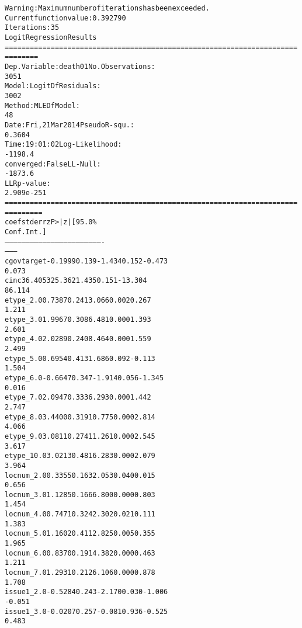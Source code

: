 \documentclass[letterpaper,10pt,english]{/usr/share/sphinx/texinputs/sphinxhowto}
\newenvironment{InvisibleVerbatim}
        {\begin{mdframed}[leftmargin=0.1\linewidth,innerleftmargin=3pt,innerrightmargin=3pt, userdefinedwidth=1\linewidth, linewidth=0pt, linecolor=white, usetwoside=false]}
        {\end{mdframed}}
\begin{document}
                \begin{InvisibleVerbatim}
                \vspace{-0.5\baselineskip}
\begin{alltt}Warning: Maximum number of iterations has been exceeded.
         Current function value: 0.392790
         Iterations: 35
                           Logit Regression Results
======================================================================
========
Dep. Variable:                death01   No. Observations:
3051
Model:                          Logit   Df Residuals:
3002
Method:                           MLE   Df Model:
48
Date:                Fri, 21 Mar 2014   Pseudo R-squ.:
0.3604
Time:                        19:01:02   Log-Likelihood:
-1198.4
converged:                      False   LL-Null:
-1873.6
                                        LLR p-value:
2.909e-251
======================================================================
=========
                  coef    std err          z      P>|z|      [95.0\%
Conf. Int.]
----------------------------------------------------------------------
---------
cgovtarget     -0.1999      0.139     -1.434      0.152        -0.473
0.073
cinc           36.4053     25.362      1.435      0.151       -13.304
86.114
etype\_2.0       0.7387      0.241      3.066      0.002         0.267
1.211
etype\_3.0       1.9967      0.308      6.481      0.000         1.393
2.601
etype\_4.0       2.0289      0.240      8.464      0.000         1.559
2.499
etype\_5.0       0.6954      0.413      1.686      0.092        -0.113
1.504
etype\_6.0      -0.6647      0.347     -1.914      0.056        -1.345
0.016
etype\_7.0       2.0947      0.333      6.293      0.000         1.442
2.747
etype\_8.0       3.4400      0.319     10.775      0.000         2.814
4.066
etype\_9.0       3.0811      0.274     11.261      0.000         2.545
3.617
etype\_10.0      3.0213      0.481      6.283      0.000         2.079
3.964
locnum\_2.0      0.3355      0.163      2.053      0.040         0.015
0.656
locnum\_3.0      1.1285      0.166      6.800      0.000         0.803
1.454
locnum\_4.0      0.7471      0.324      2.302      0.021         0.111
1.383
locnum\_5.0      1.1602      0.411      2.825      0.005         0.355
1.965
locnum\_6.0      0.8370      0.191      4.382      0.000         0.463
1.211
locnum\_7.0      1.2931      0.212      6.106      0.000         0.878
1.708
issue1\_2.0     -0.5284      0.243     -2.170      0.030        -1.006
-0.051
issue1\_3.0     -0.0207      0.257     -0.081      0.936        -0.525
0.483

\end{alltt}
\end{InvisibleVerbatim}
\end{document}
